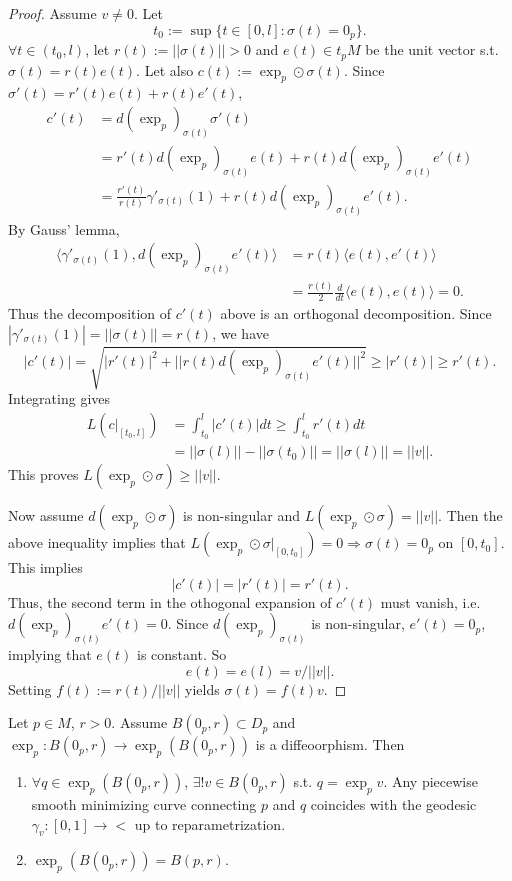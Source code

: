 \begin{proof}
Assume $v \neq 0$. Let 
\[
t_0 := \sup\{t \in [0,l] : \sigma(t) = 0_p\}.
\]
$\forall t \in (t_0, l)$, let $r(t) := ||\sigma(t)|| >0$ and $e(t) \in t_pM$ be the unit vector s.t. $\sigma(t) = r(t)e(t)$.
Let also $c(t):= \exp_p \odot \sigma(t)$. Since $\sigma'(t) = r'(t)e(t) + r(t)e'(t)$, 
\[
\begin{aligned}
c'(t) &= d(\exp_p)_{\sigma(t)}\sigma'(t) \\
&= r'(t) d(\exp_p)_{\sigma(t)}e(t) + r(t)d(\exp_p)_{\sigma(t)}e'(t) \\
&= \frac{r'(t)}{r(t)}\gamma'_{\sigma(t)}(1) + r(t)d(\exp_p)_{\sigma(t)}e'(t).
\end{aligned}
\]
By Gauss' lemma,
\[
\begin{aligned}
\langle \gamma'_{\sigma(t)}(1),d(\exp_p)_{\sigma(t)}e'(t)\rangle &= r(t) \langle e(t), e'(t)\rangle \\
&= \frac{r(t)}{2} \frac{d}{dt} \langle e(t), e(t) \rangle = 0.
\end{aligned}
\]
Thus the decomposition of $c'(t)$ above is an orthogonal decomposition.
Since $|\gamma'_{\sigma(t)}(1)| = ||\sigma(t)|| = r(t)$, we have
\[
|c'(t)| = \sqrt{|r'(t)|^2 + ||r(t)d(\exp_p)_{\sigma(t)}e'(t)||^2} \geq |r'(t)| \geq r'(t).
\]
Integrating gives
\[
\begin{aligned}
L(c|_{[t_0,l]}) &= \int_{t_0}^l|c'(t)|dt \geq \int_{t_0}^lr'(t)dt \\
&= ||\sigma(l)|| - ||\sigma(t_0)|| = ||\sigma(l)|| = ||v||.
\end{aligned}
\]
This proves $L(\exp_p\odot\sigma) \geq ||v||$.

Now assume $d(\exp_p\odot\sigma)$ is non-singular and $L(\exp_p\odot\sigma)= ||v||$. Then the above inequality implies that 
$L(\exp_p\odot\sigma|_{[0,t_0]}) = 0 \Rightarrow \sigma(t) = 0_p$ on $[0,t_0]$.
This implies
\[
|c'(t)| = |r'(t)| = r'(t).
\]
Thus, the second term in the othogonal expansion of $c'(t)$ must vanish, i.e. $d(\exp_p)_{\sigma(t)}e'(t) = 0$.
Since $d(\exp_p)_{\sigma(t)}$ is non-singular, $e'(t) = 0_p$, implying that $e(t)$ is constant. So
\[
e(t) = e(l) = v/||v||.
\]
Setting $f(t) := r(t)/||v||$ yields $\sigma(t)=f(t)v$.
\end{proof}

\begin{lemma}\label{lemma:10.9}
Let $p \in M$, $r>0$. Assume $B(0_p,r) \subset D_p$ and $\exp_p : B(0_p,r) \to \exp_p(B(0_p,r))$ is a diffeoorphism.
Then
\begin{enumerate}[label=(\arabic*)]
\item $\forall q \in \exp_p(B(0_p,r))$, $\exists ! v \in B(0_p,r)$ s.t. $q = \exp_pv$.
Any piecewise smooth minimizing curve connecting $p$ and $q$ coincides with the geodesic $\gamma_v : [0,1] \to <$ up to
reparametrization.
\item $\exp_p(B(0_p,r)) = B(p,r)$.
\end{enumerate}
\end{lemma}

